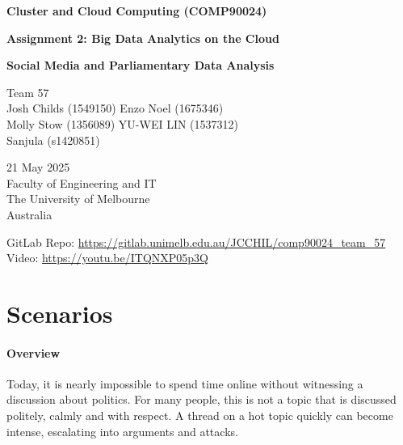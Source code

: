\documentclass[]{article}
\title{
    \vspace{2cm}

}
\date{}
\author{}
\numberwithin{equation}{section}
\begin{document}
\begin{titlepage}
    \begin{center}
        \vspace*{1cm}

        \textbf{Cluster and Cloud Computing (COMP90024)}
        \vspace{0.5cm}

        \textbf{Assignment 2: Big Data Analytics on the Cloud}
        \vspace{1cm}

        \large{\textbf{Social Media and Parliamentary Data Analysis}}
        \vspace{1cm}

        Team 57 \\
        \vspace{0.2cm}
        Josh Childs (1549150) \qquad Enzo Noel (1675346) \\ 
        Molly Stow (1356089) \qquad YU-WEI LIN (1537312) \\
        Sanjula (s1420851) \\

        \vfill 

        21 May 2025 \\
        Faculty of Engineering and IT \\ 
        The University of Melbourne \\ 
        Australia\\
    \end{center}
\end{titlepage}

\pagestyle{fancy}

GitLab Repo: \url{https://gitlab.unimelb.edu.au/JCCHIL/comp90024_team_57} \newline
Video: \url{https://youtu.be/ITQNXP05p3Q}

\section*{Scenarios}

\paragraph*{Overview}
Today, it is nearly impossible to spend time online without witnessing a discussion about politics. For many people, this is not a topic that is discussed politely, calmly and with respect. A thread on a hot topic quickly can become intense, escalating into arguments and attacks. 
\end{document}
